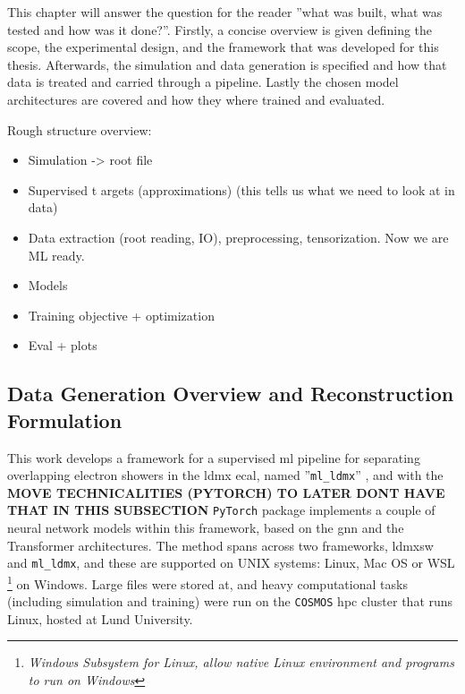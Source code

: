 This chapter will answer the question for the reader ''what was built, what was tested and how was it done?''. Firstly, a concise overview is given defining the scope, the experimental design, and the framework that was developed for this thesis. Afterwards, the simulation and data generation is specified and how that data is treated and carried through a pipeline. Lastly the chosen model architectures are covered and how they where trained and evaluated. 

Rough structure overview:
\begin{itemize}
    \item Simulation -> root file
    \item Supervised t  argets (approximations) (this tells us what we need to look at in data)
    \item Data extraction (root reading, IO), preprocessing, tensorization. Now we are ML ready. 
    \item Models 
    \item Training objective + optimization
    \item Eval + plots
\end{itemize}

\subsection{Data Generation Overview and Reconstruction Formulation}

This work develops a framework for a supervised \gls{ml} pipeline for separating overlapping
electron showers in the \gls{ldmx} \gls{ecal}, named ''\texttt{ml\_ldmx}'' \cite{ml_ldmx-github}, and with the \textbf{MOVE TECHNICALITIES (PYTORCH) TO LATER DONT HAVE THAT IN THIS SUBSECTION} \texttt{PyTorch} package implements a couple of neural network models within this framework, based on the \gls{gnn} and the Transformer architectures. The method spans across two frameworks, \gls{ldmxsw} and \texttt{ml\_ldmx}, and these are supported on UNIX systems: Linux, Mac OS or WSL \footnote{\textit{Windows Subsystem for Linux, allow native Linux environment and programs to run on Windows}} on Windows. Large files were stored at, and heavy computational tasks (including simulation and training) were run on the \texttt{COSMOS} \gls{hpc} cluster that runs Linux, hosted at Lund University. \cite{lunarc_cosmos}
































